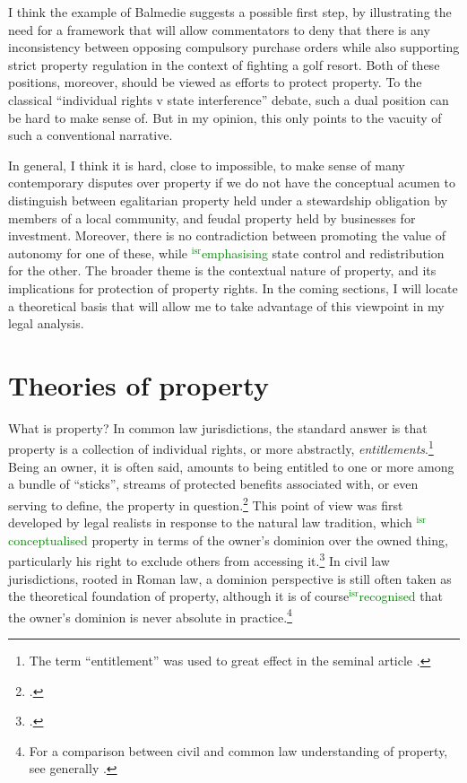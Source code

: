 \documentclass[12pt,a4paper]{book} %
\newcommand{\isr}[1]{\textcolor{green}{$^{\textrm{isr}}${#1}}}
\begin{document}
I think the example of Balmedie suggests a possible first step, by illustrating the need for a framework that will allow commentators to  deny that there is any inconsistency between opposing compulsory purchase orders while also supporting strict property regulation in the context of fighting a golf resort. Both of these positions, moreover, should be viewed as efforts to protect property. To the classical ``individual rights v state interference'' debate, such a dual position can be hard to make sense of. But in my opinion, this only points to the vacuity of such a conventional narrative.

In general, I think it is hard, close to impossible, to make sense of many contemporary disputes over property if we do not have the conceptual acumen to distinguish between egalitarian property held under a stewardship obligation by members of a local community, and feudal property held by businesses for investment. Moreover, there is no contradiction between promoting the value of autonomy for one of these, while \isr{emphasising} state control and redistribution for the other. The broader theme is the contextual nature of property, and its implications for protection of property rights. In the coming sections, I will locate a theoretical basis that will allow me to take advantage of this viewpoint in my legal analysis.

\section{Theories of property}\label{sec:top}

What is property? In common law jurisdictions, the standard answer is that property is a collection of individual rights, or more abstractly, {\it entitlements}.\footnote{The term ``entitlement'' was used to great effect in the seminal article \cite{calabresi72}.} Being an owner, it is often said, amounts to being entitled to one or more among a bundle of ``sticks'', streams of protected benefits associated with, or even serving to define, the property in question.\footcite[357-358]{merrill01} This point of view was first developed by legal realists in response to the natural law tradition, which \isr{conceptualised} property in terms of the owner's dominion over the owned thing, particularly his right to exclude others from accessing it.\footcite[193-195]{klein11} In civil law jurisdictions, rooted in Roman law, a dominion perspective is still often taken as the theoretical foundation of property, although it is of course\isr{recognised} that the owner's dominion is never absolute in practice.\footnote{For a comparison between civil and common law understanding of property, see generally \cite{chang12}.}
\end{document}
